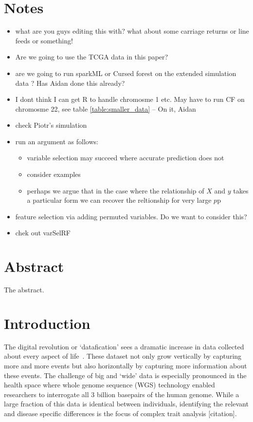 \documentclass[10pt,letterpaper]{article}
\begin{document}
\section*{Notes}
\begin{itemize}
\item what are you guys editing this with?  what about some carriage
  returns or line feeds or something!
\item Are we going to use the TCGA data in this paper?
\item are we going to run sparkML or Cursed forest on the extended
  simulation data \cite[]{Genuer.et.al.2010}? Has Aidan done this already?
\item I dont think I can get R to handle chromosme 1 etc. May have to run CF on chromosme 22, see table
  \ref{table:smaller_data} -- On it, Aidan
\item check Piotr's simulation
\item run an argument as follows:
  \begin{itemize}
  \item variable  selection may succeed where accurate prediction does not
  \item consider  \cite{Segal.2004} examples
  \item  perhaps we argue that in the case where the relationship of $X$ and $y$ takes a particular form we can recover
    the reltionship for very large $p$p
  \end{itemize}
\item \cite{Tuv.et.al.2009} feature selection via adding permuted variables. Do we want to consider this?
\item chek out varSelRF
\end{itemize}


\section*{Abstract}
The abstract.

\linenumbers

\section*{Introduction}

The digital revolution or `datafication' sees a dramatic increase in data collected about every aspect of   
life~\cite{Loebbecke2015}.  These dataset not only grow vertically by capturing more and more events but also
horizontally by capturing more information about these events.  The challenge of big and `wide' data is especially
pronounced in the health space where whole genome sequence (WGS) technology enabled researchers to interrogate all 3
billion basepairs of the human genome.  While a large fraction of this data is identical between individuals, 
identifying the relevant and disease specific differences is the focus of complex trait analysis [citation].
\end{document}
